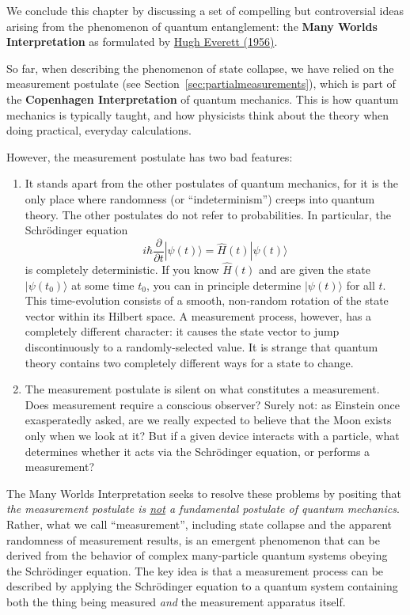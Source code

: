 \documentclass[pra,12pt]{revtex4}
\begin{document}
We conclude this chapter by discussing a set of compelling but
controversial ideas arising from the phenomenon of quantum
entanglement: the \textbf{Many Worlds Interpretation} as formulated by
\hyperref[cite:everett]{Hugh Everett (1956)}.

So far, when describing the phenomenon of state collapse, we have
relied on the measurement postulate (see
Section~\ref{sec:partialmeasurements}), which is part of the
\textbf{Copenhagen Interpretation} of quantum mechanics.  This is how
quantum mechanics is typically taught, and how physicists think about
the theory when doing practical, everyday calculations.

However, the measurement postulate has two bad features:

\begin{enumerate}
\item It stands apart from the other postulates of quantum mechanics,
  for it is the only place where randomness (or ``indeterminism'')
  creeps into quantum theory.  The other postulates do not refer to
  probabilities.  In particular, the Schr\"odinger equation
\begin{equation}
  i\hbar\frac{\partial}{\partial t}|\psi(t)\rangle = \hat{H}(t) |\psi(t)\rangle
\end{equation}
is completely deterministic.  If you know $\hat{H}(t)$ and are given
the state $|\psi(t_0)\rangle$ at some time $t_0$, you can in principle
determine $|\psi(t)\rangle$ for all $t$.  This time-evolution consists
of a smooth, non-random rotation of the state vector within its
Hilbert space.  A measurement process, however, has a completely
different character: it causes the state vector to jump
discontinuously to a randomly-selected value.  It is strange that
quantum theory contains two completely different ways for a state to
change.

\item The measurement postulate is silent on what constitutes a
measurement.  Does measurement require a conscious observer?  Surely
not: as Einstein once exasperatedly asked, are we really expected to
believe that the Moon exists only when we look at it?  But if a given
device interacts with a particle, what determines whether it acts via
the Schr\"odinger equation, or performs a measurement?
\end{enumerate}

The Many Worlds Interpretation seeks to resolve these problems by
positing that \textit{the measurement postulate is \underline{not} a
  fundamental postulate of quantum mechanics}.  Rather, what we call
``measurement'', including state collapse and the apparent randomness
of measurement results, is an emergent phenomenon that can be derived
from the behavior of complex many-particle quantum systems obeying the
Schr\"odinger equation.  The key idea is that a measurement process
can be described by applying the Schr\"odinger equation to a quantum
system containing both the thing being measured \textit{and} the
measurement apparatus itself.
\end{document}
